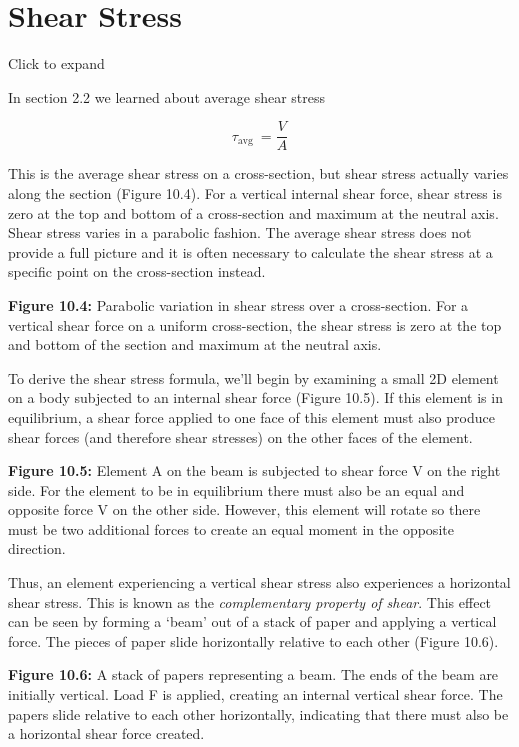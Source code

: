 \documentclass[
  letterpaper,
  DIV=11,
  numbers=noendperiod]{scrreprt}
\begin{document}
\section{Shear Stress}\label{sec-10.2}

Click to expand

In section 2.2 we learned about average shear stress

\[
\tau_{\text {avg }}=\frac{V}{A}
\]

This is the average shear stress on a cross-section, but shear stress
actually varies along the section (Figure 10.4). For a vertical internal
shear force, shear stress is zero at the top and bottom of a
cross-section and maximum at the neutral axis. Shear stress varies in a
parabolic fashion. The average shear stress does not provide a full
picture and it is often necessary to calculate the shear stress at a
specific point on the cross-section instead.

\textbf{Figure 10.4:} Parabolic variation in shear stress over a
cross-section. For a vertical shear force on a uniform cross-section,
the shear stress is zero at the top and bottom of the section and
maximum at the neutral axis.

To derive the shear stress formula, we'll begin by examining a small 2D
element on a body subjected to an internal shear force (Figure 10.5). If
this element is in equilibrium, a shear force applied to one face of
this element must also produce shear forces (and therefore shear
stresses) on the other faces of the element.

\textbf{Figure 10.5:} Element A on the beam is subjected to shear force
V on the right side. For the element to be in equilibrium there must
also be an equal and opposite force V on the other side. However, this
element will rotate so there must be two additional forces to create an
equal moment in the opposite direction.

Thus, an element experiencing a vertical shear stress also experiences a
horizontal shear stress. This is known as the \emph{complementary
property of shear}. This effect can be seen by forming a `beam' out of a
stack of paper and applying a vertical force. The pieces of paper slide
horizontally relative to each other (Figure 10.6).

\textbf{Figure 10.6:} A stack of papers representing a beam. The ends of
the beam are initially vertical. Load F is applied, creating an internal
vertical shear force. The papers slide relative to each other
horizontally, indicating that there must also be a horizontal shear
force created.
\end{document}
